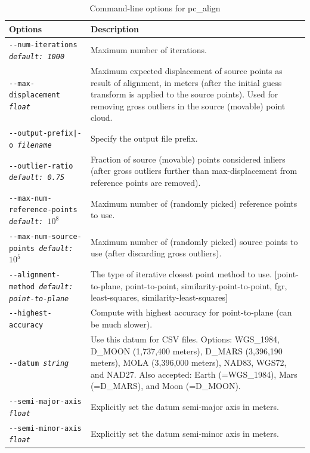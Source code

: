 \begin{longtable}{|p{8cm}|p{9cm}|}
\caption{Command-line options for pc\_align}
\label{tbl:pcalign}
\endfirsthead
\endhead
\endfoot
\endlastfoot
\hline
Options & Description \\ \hline \hline
\texttt{-\/-num-iterations \textit{default: 1000}} &  Maximum number of iterations. \\ \hline

\texttt{-\/-max-displacement \textit{float}} & Maximum expected
displacement of source points as result of alignment, in meters (after
the initial guess transform is applied to the source points). Used
for removing gross outliers in the source (movable) point cloud.\\ \hline

\texttt{-\/-output-prefix|-o \textit{filename}} & Specify the output file prefix. \\ \hline

\texttt{-\/-outlier-ratio \textit{default: 0.75}} &  Fraction of source (movable) points considered inliers (after gross outliers further than max-displacement from reference points are removed). \\ \hline
\texttt{-\/-max-num-reference-points \textit{default: $10^8$}} &
Maximum number of (randomly picked) reference points to use. \\ \hline
\texttt{-\/-max-num-source-points \textit{default: $10^5$}} & Maximum number of (randomly picked) source points to use (after discarding gross outliers). \\ \hline
\texttt{-\/-alignment-method \textit{default: point-to-plane}} & The type of iterative closest point method to use. [point-to-plane, point-to-point, similarity-point-to-point, fgr, least-squares, similarity-least-squares]\\ \hline
\texttt{-\/-highest-accuracy} & Compute with highest accuracy for point-to-plane (can be much slower). \\ \hline

\texttt{-\/-datum \textit{string}} & Use this datum for CSV files. Options: WGS\_1984, D\_MOON (1,737,400 meters), D\_MARS (3,396,190 meters), MOLA (3,396,000 meters), NAD83, WGS72, and NAD27. Also accepted: Earth (=WGS\_1984), Mars (=D\_MARS), and Moon (=D\_MOON). \\ \hline

\texttt{-\/-semi-major-axis \textit{float}} & Explicitly set the datum semi-major axis in meters.\\ \hline
\texttt{-\/-semi-minor-axis \textit{float}} & Explicitly set the datum semi-minor axis in meters.\\ \hline


\end{longtable}
